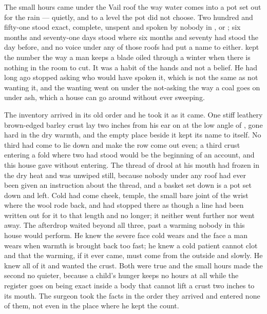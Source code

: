 
The small hours came under the Vail roof the way water comes into a pot set out for the rain --- quietly, and to a level the pot did not choose. Two hundred and fifty-one stood exact, complete, unspent and spoken by nobody in ,  or ; six months and seventy-one days stood where six months and seventy had stood the day before, and no voice under any of those roofs had put a name to either.  kept the number the way a man keeps a blade oiled through a winter when there is nothing in the room to cut. It was a habit of the hands and not a belief. He had long ago stopped asking who would have spoken it, which is not the same as not wanting it, and the wanting went on under the not-asking the way a coal goes on under ash, which a house can go around without ever sweeping.

The inventory arrived in its old order and he took it as it came. One stiff leathery brown-edged barley crust lay two inches from his ear on  at the low angle of , gone hard in the dry warmth, and the empty place beside it kept its name to itself. No third had come to lie down and make the row come out even; a third crust entering a fold where two had stood would be the beginning of an account, and this house gave without entering. The thread of drool at his mouth had frozen in the dry heat and was unwiped still, because nobody under any roof had ever been given an instruction about the thread, and a basket set down is a pot set down and left. Cold had come cheek, temple, the small bare joint of the wrist where the wool rode back, and had stopped there as though a line had been written out for it to that length and no longer; it neither went further nor went away. The afterdrop waited beyond all three, past a warming nobody in this house would perform. He knew the severe face cold wears and the face a man wears when warmth is brought back too fast; he knew a cold patient cannot clot and that the warming, if it ever came, must come from the outside and slowly. He knew all of it and wanted the crust. Both were true and the small hours made the second no quieter, because a child's hunger keeps no hours at all while the register goes on being exact inside a body that cannot lift a crust two inches to its mouth. The surgeon took the facts in the order they arrived and entered none of them, not even in the place where he kept the count.

